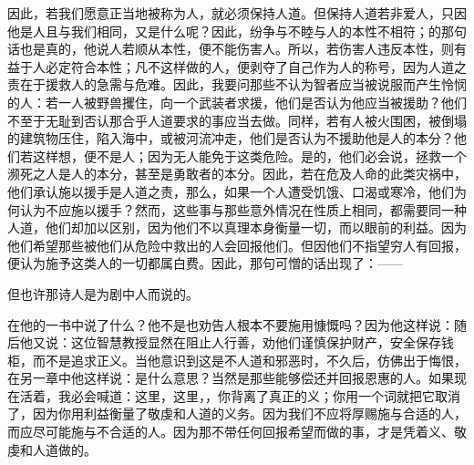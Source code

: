 因此，若我们愿意正当地被称为人，就必须保持人道。但保持人道若非爱人，只因他是人且与我们相同，又是什么呢？因此，纷争与不睦与人的本性不相符；的那句话也是真的，他说人若顺从本性，便不能伤害人。所以，若伤害人违反本性，则有益于人必定符合本性；凡不这样做的人，便剥夺了自己作为人的称号，因为人道之责在于援救人的急需与危难。因此，我要问那些不认为智者应当被说服而产生怜悯的人：若一人被野兽攫住，向一个武装者求援，他们是否认为他应当被援助？他们不至于无耻到否认那合乎人道要求的事应当去做。同样，若有人被火围困，被倒塌的建筑物压住，陷入海中，或被河流冲走，他们是否认为不援助他是人的本分？他们若这样想，便不是人；因为无人能免于这类危险。是的，他们必会说，拯救一个濒死之人是人的本分，甚至是勇敢者的本分。因此，若在危及人命的此类灾祸中，他们承认施以援手是人道之责，那么，如果一个人遭受饥饿、口渴或寒冷，他们为何认为不应施以援手？然而，这些事与那些意外情况在性质上相同，都需要同一种人道，他们却加以区别，因为他们不以真理本身衡量一切，而以眼前的利益。因为他们希望那些被他们从危险中救出的人会回报他们。但因他们不指望穷人有回报，便认为施予这类人的一切都属白费。因此，那句可憎的话出现了：——\par

\par

但也许那诗人是为剧中人而说的。\par

在他的一书中说了什么？他不是也劝告人根本不要施用慷慨吗？因为他这样说：随后他又说：这位智慧教授显然在阻止人行善，劝他们谨慎保护财产，安全保存钱柜，而不是追求正义。当他意识到这是不人道和邪恶时，不久后，仿佛出于悔恨，在另一章中他这样说：是什么意思？当然是那些能够偿还并回报恩惠的人。如果现在活着，我必会喊道：这里，这里，，你背离了真正的义；你用一个词就把它取消了，因为你用利益衡量了敬虔和人道的义务。因为我们不应将厚赐施与合适的人，而应尽可能施与不合适的人。因为那不带任何回报希望而做的事，才是凭着义、敬虔和人道做的。\par

